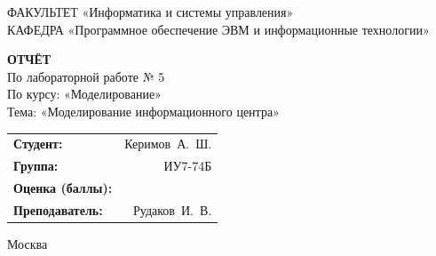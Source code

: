 \begin{titlepage}
{	{\doublespacing \small \raggedright ФАКУЛЬТЕТ \hspace{37mm} «Информатика и системы управления»\\
	КАФЕДРА \hspace{17mm} «Программное обеспечение ЭВМ и информационные технологии»\\}

	\vspace{30mm}

	\textbf{ОТЧЁТ}\\
	По лабораторной работе № 5\\
	По курсу: «Моделирование»\\
	Тема: «Моделирование информационного центра»\\

	\vspace{40mm}

	\begin{flushleft}
		\begin{tabular}{lr}
			\textbf{Студент:}        & Керимов~А.~Ш. \\
			\textbf{Группа:}         & ИУ7-74Б       \\
			\textbf{Оценка (баллы):} & \hrulefill    \\
			\textbf{Преподаватель:}  & Рудаков~И.~В. \\
		\end{tabular}
	\end{flushleft}

	\vfill

	Москва\\
	\the\year\\}
\end{titlepage}

\setcounter{page}{2}
